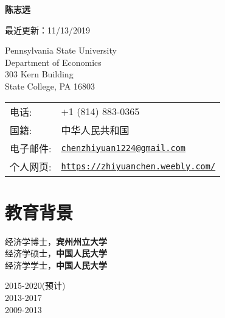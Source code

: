\documentclass[letterpaper]{article}
\def\name{陈志远}
\begin{document}

\centerline{\huge \bf \name}

\vspace{1ex}
\begin{center}
    {\scriptsize 最近更新：11/13/2019}
\end{center}
\normalsize
\vspace{0.25in}

\begin{minipage}{0.5\linewidth}
  {Pennsylvania State University} \\
  Department of Economics \\
  303 Kern Building \\
  State College, PA 16803
\end{minipage}
\begin{minipage}{0.5\linewidth}
  \begin{tabular}{ll}
    电话: & +1 (814) 883-0365 \\
    国籍: &  中华人民共和国 \\
    电子邮件: & \href{mailto:chenzhiyuan1224@gmail.com}{\tt chenzhiyuan1224@gmail.com} \\
    个人网页: & \href{https://zhiyuanchen.weebly.com/}{\tt https://zhiyuanchen.weebly.com/} \\
  \end{tabular}
\end{minipage}





\section*{\textsc{教育背景}}

\begin{minipage}{0.5\linewidth}
  经济学博士，\textbf{宾州州立大学} \\
  经济学硕士，\textbf{中国人民大学}  \\
  经济学学士，\textbf{中国人民大学}
\end{minipage}
\begin{minipage}{0.5\linewidth}
  2015-2020(预计)\\
  2013-2017\\
  2009-2013
\end{minipage}
\end{document}
